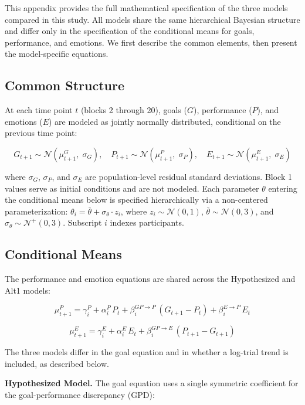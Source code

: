 \documentclass[
  man,
  floatsintext,
  longtable,
  nolmodern,
  notxfonts,
  notimes,
  colorlinks=true,linkcolor=blue,citecolor=blue,urlcolor=blue]{apa7}
\begin{document}
This appendix provides the full mathematical specification of the three
models compared in this study. All models share the same hierarchical
Bayesian structure and differ only in the specification of the
conditional means for goals, performance, and emotions. We first
describe the common elements, then present the model-specific equations.

\subsection{Common Structure}\label{common-structure}

At each time point \(t\) (blocks 2 through 20), goals (\(G\)),
performance (\(P\)), and emotions (\(E\)) are modeled as jointly
normally distributed, conditional on the previous time point:

\[
G_{t+1} \sim \mathcal{N}(\mu^G_{t+1},\; \sigma_G), \quad
P_{t+1} \sim \mathcal{N}(\mu^P_{t+1},\; \sigma_P), \quad
E_{t+1} \sim \mathcal{N}(\mu^E_{t+1},\; \sigma_E)
\tag{A1}
\]

where \(\sigma_G\), \(\sigma_P\), and \(\sigma_E\) are population-level
residual standard deviations. Block 1 values serve as initial conditions
and are not modeled. Each parameter \(\theta\) entering the conditional
means below is specified hierarchically via a non-centered
parameterization: \(\theta_i = \bar{\theta} + \sigma_\theta \cdot z_i\),
where \(z_i \sim \mathcal{N}(0, 1)\),
\(\bar{\theta} \sim \mathcal{N}(0, 3)\), and
\(\sigma_\theta \sim \mathcal{N}^+(0, 3)\). Subscript \(i\) indexes
participants.

\subsection{Conditional Means}\label{conditional-means}

The performance and emotion equations are shared across the Hypothesized
and Alt1 models:

\[
\mu^P_{t+1} = \gamma^P_i + \alpha^P_i \, P_t + \beta^{GP \to P}_i \,(G_{t+1} - P_t) + \beta^{E \to P}_i \, E_t \tag{A2}
\]

\[
\mu^E_{t+1} = \gamma^E_i + \alpha^E_i \, E_t + \beta^{GP \to E}_i \,(P_{t+1} - G_{t+1}) \tag{A3}
\]

The three models differ in the goal equation and in whether a log-trial
trend is included, as described below.

\textbf{Hypothesized Model.} The goal equation uses a single symmetric
coefficient for the goal-performance discrepancy (GPD):
\end{document}
